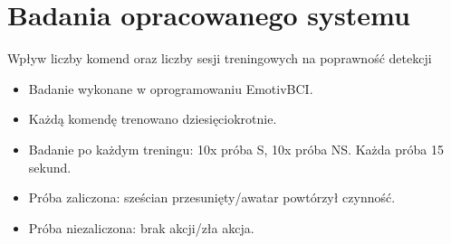 \documentclass[10pt,aspectratio=169]{beamer}
\begin{document}
\section{Badania opracowanego systemu}
\begin{frame}{Wpływ liczby komend oraz liczby sesji treningowych na poprawność detekcji}
  \begin{itemize}
    \item Badanie wykonane w oprogramowaniu EmotivBCI.
    \item Każdą komendę trenowano dziesięciokrotnie.
    \item Badanie po każdym treningu: 10x próba S, 10x próba NS. Każda próba 15 sekund.
    \item Próba zaliczona: sześcian przesunięty/awatar powtórzył czynność.
    \item Próba niezaliczona: brak akcji/zła akcja.
  \end{itemize}
\end{frame}
\end{document}
